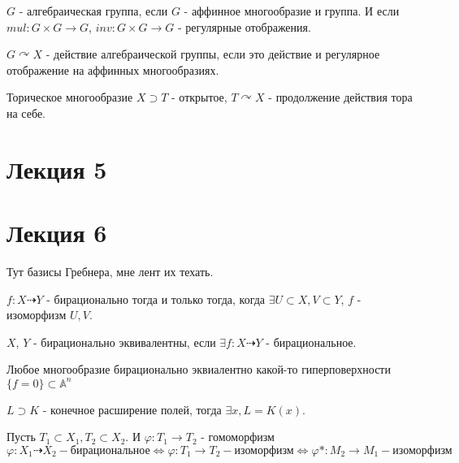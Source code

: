 \documentclass{article}
\begin{document}
\begin{definition}
    $G$ - алгебраическая группа, если $G$ - аффинное многообразие и группа. И если $mul : G \times G \to G$,
    $inv : G \times G \to G$ - регулярные отображения.
\end{definition}

\begin{definition}
    $G \curvearrowright X$ - действие алгебраической группы, если это действие и регулярное отображение на аффинных многообразиях.
\end{definition}

\begin{definition}
    Торическое многообразие $X \supset T$ - открытое, $T \curvearrowright X$ - продолжение действия тора на себе.
\end{definition}

\section*{Лекция 5}

\section*{Лекция 6}

Тут базисы Гребнера, мне лент их техать.

\begin{definition}
    $f : X \dashrightarrow Y$ - бирационально тогда и только тогда, когда
    $\exists U \subset X, V \subset Y$, $f$ - изоморфизм $U, V$.
\end{definition}

\begin{definition}
    $X$, $Y$ - бирационально эквивалентны, если $\exists f : X \dashrightarrow Y$ - бирациональное.
\end{definition}

\begin{theorem}
    Любое многообразие бирационально эквиалентно какой-то гиперповерхности $\{f = 0\} \subset \mathbb{A}^n$
\end{theorem}

\begin{theorem}
    $L \supset K$ - конечное расширение полей, тогда $\exists x, L = K(x)$.
\end{theorem}

\begin{theorem}
    Пусть $T_1 \subset X_1, T_2 \subset X_2$. И $\varphi : T_1 \to T_2$ - гомоморфизм
    $$\varphi : X_1 \dashrightarrow X_2 - \text{бирациональное} \Longleftrightarrow \varphi : T_1 \to T_2 - \text{изоморфизм} \Longleftrightarrow \varphi* : M_2 \to M_1 - \text{изоморфизм}$$
\end{theorem}
\end{document}
